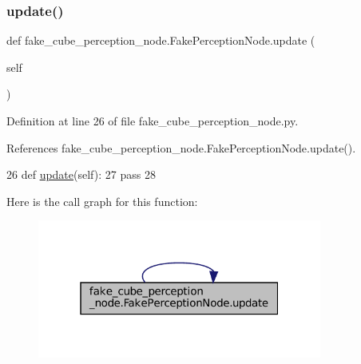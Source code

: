 \subsubsection{\texorpdfstring{update()}{update()}\hspace{0.1cm}{\footnotesize\ttfamily [1/2]}}
{\footnotesize\ttfamily def fake\+\_\+cube\+\_\+perception\+\_\+node.\+Fake\+Perception\+Node.\+update (\begin{DoxyParamCaption}\item[{}]{self }\end{DoxyParamCaption})}



Definition at line 26 of file fake\+\_\+cube\+\_\+perception\+\_\+node.\+py.



References fake\+\_\+cube\+\_\+perception\+\_\+node.\+Fake\+Perception\+Node.\+update().


\begin{DoxyCode}
26     \textcolor{keyword}{def }\hyperlink{classfake__cube__perception__node_1_1FakePerceptionNode_ae73741e7f84f057cbf109698e70a2515}{update}(self):
27         \textcolor{keywordflow}{pass}
28 
\end{DoxyCode}
Here is the call graph for this function\+:
\nopagebreak
\begin{figure}[H]
\begin{center}
\leavevmode
\includegraphics[width=265pt]{classfake__cube__perception__node_1_1FakePerceptionNode_ae73741e7f84f057cbf109698e70a2515_cgraph}
\end{center}
\end{figure}
\mbox{\label{classfake__cube__perception__node_1_1FakePerceptionNode_ae73741e7f84f057cbf109698e70a2515}} 
